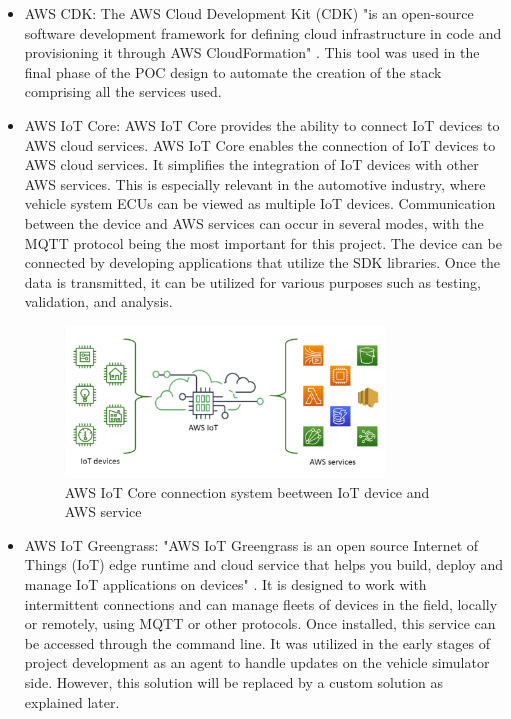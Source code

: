 \begin{itemize}
\begin{figure}[h]
        \label{fig:AWSSDK}
    \end{figure}
    \item AWS CDK: The AWS Cloud Development Kit (CDK) "is an open-source software development framework for defining cloud infrastructure in code and provisioning it through AWS CloudFormation" \cite{WhatIsTheAWSCDK}. This tool was used in the final phase of the POC design to automate the creation of the stack comprising all the services used.
    \item AWS IoT Core: AWS IoT Core provides the ability to connect IoT devices to AWS cloud services. AWS IoT Core enables the connection of IoT devices to AWS cloud services. It simplifies the integration of IoT devices with other AWS services. This is especially relevant in the automotive industry, where vehicle system ECUs can be viewed as multiple IoT devices. Communication between the device and AWS services can occur in several modes, with the MQTT protocol being the most important for this project. The device can be connected by developing applications that utilize the SDK libraries. Once the data is transmitted, it can be utilized for various purposes such as testing, validation, and analysis.
    \begin{figure}[h]  %
        \centering
        \includegraphics[width=0.8\textwidth]{images/AWSIoTCore.png}  %
        \caption{AWS IoT Core connection system beetween IoT device and AWS service \cite{AWSIoTCore}}
        \label{fig:AWSIoTCore}
    \end{figure}
    \item AWS IoT Greengrass: "AWS IoT Greengrass is an open source Internet of Things (IoT) edge runtime and cloud service that helps you build, deploy and manage IoT applications on devices" \cite{AWSIoTGreengrass}. It is designed to work with intermittent connections and can manage fleets of devices in the field, locally or remotely, using MQTT or other protocols. Once installed, this service can be accessed through the command line. It was utilized in the early stages of project development as an agent to handle updates on the vehicle simulator side. However, this solution will be replaced by a custom solution as explained later.

\end{itemize}
